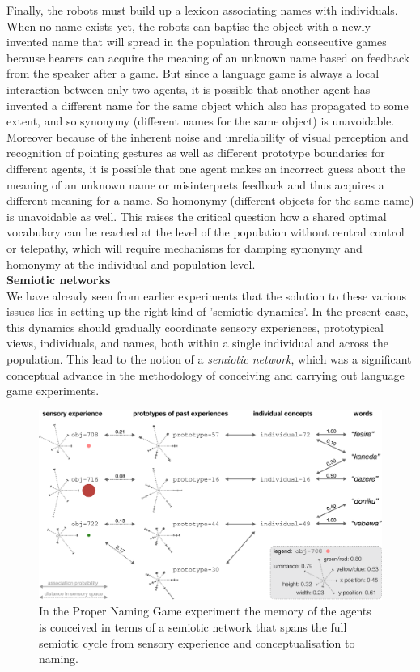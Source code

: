Finally, the robots must build up a lexicon associating names with individuals. When no name
exists yet, the robots can baptise the object with a newly invented name that
will spread in the population through consecutive games because
hearers can acquire the meaning of an unknown name based on feedback
from the speaker after a game. But since a language game is always a
local interaction between only two agents, it is possible that another
agent has invented a different name for the same object which also has
propagated to some extent, and so synonymy (different names for the
same object) is unavoidable. Moreover because of the inherent noise
and unreliability of visual perception and recognition of pointing
gestures as well as different prototype boundaries for different
agents, it is possible that one agent makes an incorrect guess about
the meaning of an unknown name or misinterprets feedback and thus
acquires a different meaning for a name. So homonymy (different
objects for the same name) is unavoidable as well. This raises the
critical question how a shared optimal vocabulary can be reached at
the level of the population without central control or telepathy,
which will require mechanisms for damping synonymy and homonymy at the
individual and population level.\\

{\bf Semiotic networks}\\

We have already seen from earlier experiments that the solution to these various issues lies in setting up
the right kind of 'semiotic dynamics'. In the present case, this dynamics should gradually coordinate
sensory experiences, prototypical views, individuals, 
and names, both within a single individual and across the
population. This lead to the notion of a {\it semiotic network}, which was a significant conceptual advance 
in the methodology of conceiving and carrying out language game experiments.

\begin{figure}[htbp]
  \centerline{\includegraphics[width=.95\textwidth]{chap10/figs/prototypes-identifiers-words}}
\caption{\label{fig:prototypes-identifiers-words} 
In the Proper Naming Game experiment the memory of the agents is conceived in terms of a semiotic network that 
spans the full semiotic cycle from sensory experience and conceptualisation to naming.}
\end{figure}

